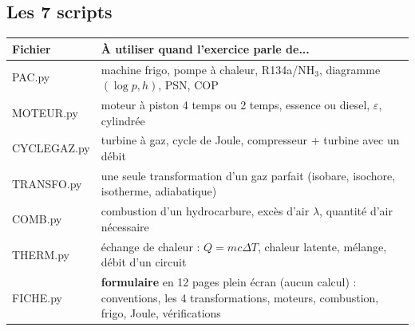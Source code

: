 \documentclass[10.5pt,a4paper]{article}
\begin{document}
\subsection*{Les 7 scripts}
\begin{center}
\renewcommand{\arraystretch}{1.35}
\begin{tabularx}{\linewidth}{@{}>{\ttfamily}l X@{}}
\toprule
\textrm{\textbf{Fichier}} & \textbf{À utiliser quand l'exercice parle de...} \\
\midrule
PAC.py & machine frigo, pompe à chaleur, R134a/NH$_3$, diagramme $(\log p,h)$, PSN, COP \\
MOTEUR.py & moteur à piston 4 temps ou 2 temps, essence ou diesel, $\varepsilon$, cylindrée \\
CYCLEGAZ.py & turbine à gaz, cycle de Joule, compresseur + turbine avec un débit \\
TRANSFO.py & une seule transformation d'un gaz parfait (isobare, isochore, isotherme, adiabatique) \\
COMB.py & combustion d'un hydrocarbure, excès d'air $\lambda$, quantité d'air nécessaire \\
THERM.py & échange de chaleur : $Q=mc\Delta T$, chaleur latente, mélange, débit d'un circuit \\
FICHE.py & \textbf{formulaire} en 12 pages plein écran (aucun calcul) : conventions, les 4
transformations, moteurs, combustion, frigo, Joule, vérifications \\
\bottomrule
\end{tabularx}
\end{center}
\end{document}

